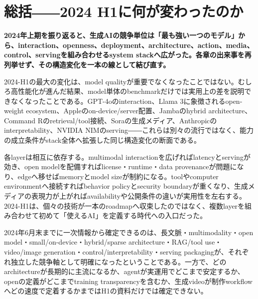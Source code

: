 \section{総括――2024 H1に何が変わったのか}
\noindent\textbf{2024年上期を振り返ると、生成AIの競争単位は「最も強い一つのモデル」から、interaction、openness、deployment、architecture、action、media、control、servingを組み合わせるsystem stackへ広がった。各章の出来事を再列挙せず、その構造変化を一本の線として結び直す。}\autocite{src-054d1f81750b,src-0fe343211040,src-2d3a533e91db,src-4ff5ab7d45bc,src-77e35e5f22be,src-b5fbfc0d43e4,src-c89d38f0e830,src-f9616f30e8f5}

2024-H1の最大の変化は、model qualityが重要でなくなったことではない。むしろ高性能化が進んだ結果、model単体のbenchmarkだけでは実用上の差を説明できなくなったことである。GPT-4oのinteraction、Llama 3に象徴されるopen-weight ecosystem、Appleのon-device/server配置、Jambaのhybrid architecture、Command Rのretrieval/tool接続、Soraの生成メディア、Anthropicのinterpretability、NVIDIA NIMのserving――これらは別々の流行ではなく、能力の成立条件がstack全体へ拡張した同じ構造変化の断面である。\autocite{src-054d1f81750b,src-0fe343211040,src-2d3a533e91db,src-4ff5ab7d45bc,src-77e35e5f22be,src-b5fbfc0d43e4,src-c89d38f0e830,src-f9616f30e8f5}


各layerは相互に依存する。multimodal interactionを広げればlatencyとservingが効き、open modelを配備すればlicense・runtime・data provenanceが問題になり、edgeへ移せばmemoryとmodel sizeが制約になる。toolやcomputer environmentへ接続すればbehavior policyとsecurity boundaryが重くなり、生成メディアの表現力が上がればavailabilityや公開条件の違いが実用性を左右する。2024-H1は、個々の技術が一本のroadmapへ収束したのではなく、複数layerを組み合わせて初めて「使えるAI」を定義する時代への入口だった。\autocite{src-054d1f81750b,src-0fe343211040,src-2d3a533e91db,src-4ff5ab7d45bc,src-77e35e5f22be,src-c89d38f0e830,src-f9616f30e8f5}


2024年6月末までに一次情報から確定できるのは、長文脈・multimodality・open model・small/on-device・hybrid/sparse architecture・RAG/tool use・video/image generation・control/interpretability・serving packagingが、それぞれ独立した競争軸として明確になったということである。一方で、どのarchitectureが長期的に主流になるか、agentが実運用でどこまで安定するか、openの定義がどこまでtraining transparencyを含むか、生成videoが制作workflowへどの速度で定着するかまではH1の資料だけでは確定できない。\autocite{src-054d1f81750b,src-0fe343211040,src-2d3a533e91db,src-4ff5ab7d45bc,src-77e35e5f22be,src-b5fbfc0d43e4,src-c89d38f0e830,src-f9616f30e8f5}


